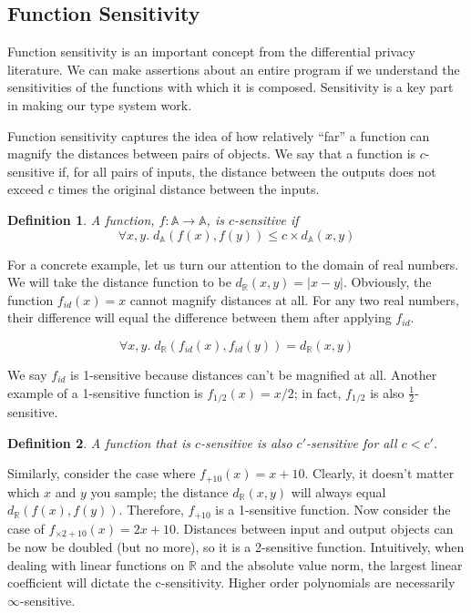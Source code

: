 \documentclass[12pt]{article}
\newtheorem{defn}{Definition}[section]
\begin{document}
\subsection{Function Sensitivity}

Function sensitivity is an important concept from the differential privacy literature.
We can make assertions about an entire program if we understand the sensitivities of the functions with which it is composed.
Sensitivity is a key part in making our type system work.

Function sensitivity captures the idea of how relatively ``far'' a function can magnify the distances between pairs of objects.
We say that a function is $c$-sensitive if, for all pairs of inputs, the distance between the outputs does not exceed $c$ times the original distance between the inputs.

\begin{defn}\label{def:csens}
  A function, $f : \mathbb A \rightarrow \mathbb A$, is $c$-sensitive if
  $$\forall x,y.\; d_{\mathbb A}(f(x),f(y)) \le c \times d_{\mathbb A}(x,y)$$
\end{defn}

For a concrete example, let us turn our attention to the domain of real numbers.
We will take the distance function to be $d_\mathbb{R}(x,y) = |x - y|$.
Obviously, the function $f_{id}(x)=x$ cannot magnify distances at all.
For any two real numbers, their difference will equal the difference between them after applying $f_{id}$.

\[
  \forall x,y.\; d_\mathbb{R}(f_{id}(x),f_{id}(y)) = d_\mathbb{R}(x,y)
\]

We say $f_{id}$ is 1-sensitive because distances can't be magnified at all.
Another example of a 1-sensitive function is $f_{1/2}(x) = x/2$; in fact, $f_{1/2}$ is also $\frac{1}{2}$-sensitive.

\begin{defn}\label{def:clessthancprime}
  A function that is $c$-sensitive is also $c'$-sensitive for all $c < c'$.
\end{defn}

Similarly, consider the case where $f_{+10}(x) = x + 10$.
Clearly, it doesn't matter which $x$ and $y$ you sample; the distance $d_{\mathbb R}(x,y)$ will always equal $d_{\mathbb R}(f(x),f(y))$.
Therefore, $f_{+10}$ is a 1-sensitive function.
Now consider the case of $f_{\times 2+10}(x) = 2x + 10$.
Distances between input and output objects can be now be doubled (but no more), so it is a 2-sensitive function.
Intuitively, when dealing with linear functions on $\mathbb R$ and the absolute value norm, the largest linear coefficient will dictate the c-sensitivity.
Higher order polynomials are necessarily $\infty$-sensitive.
\end{document}
